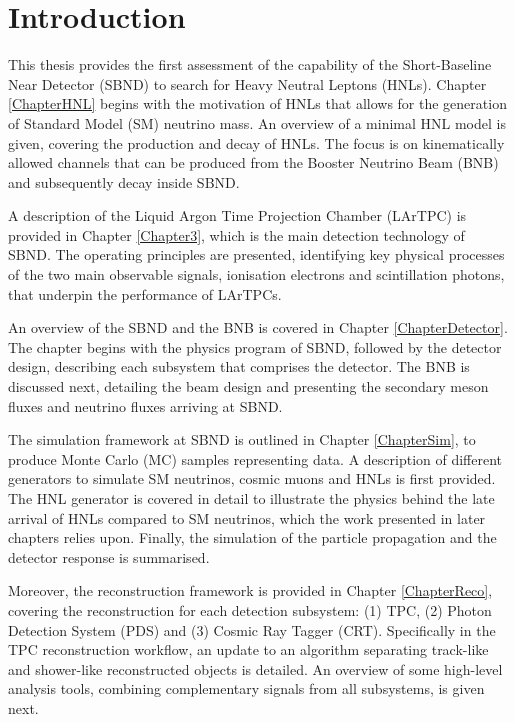 
\chapter{Introduction}  %

This thesis provides the first assessment of the capability of the Short-Baseline Near Detector (SBND) to search for Heavy Neutral Leptons (HNLs).
Chapter \ref{ChapterHNL} begins with the motivation of HNLs that allows for the generation of Standard Model (SM) neutrino mass.
An overview of a minimal HNL model is given, covering the production and decay of HNLs.
The focus is on kinematically allowed channels that can be produced from the Booster Neutrino Beam (BNB) and subsequently decay inside SBND.

A description of the Liquid Argon Time Projection Chamber (LArTPC) is provided in Chapter \ref{Chapter3}, which is the main detection technology of SBND.
The operating principles are presented, identifying key physical processes of the two main observable signals, ionisation electrons and scintillation photons, that underpin the performance of LArTPCs.

An overview of the SBND and the BNB is covered in Chapter \ref{ChapterDetector}.
The chapter begins with the physics program of SBND, followed by the detector design, describing each subsystem that comprises the detector.
The BNB is discussed next, detailing the beam design and presenting the secondary meson fluxes and neutrino fluxes arriving at SBND.

The simulation framework at SBND is outlined in Chapter \ref{ChapterSim}, to produce Monte Carlo (MC) samples representing data.
A description of different generators to simulate SM neutrinos, cosmic muons and HNLs is first provided.
The HNL generator is covered in detail to illustrate the physics behind the late arrival of HNLs compared to SM neutrinos, which the work presented in later chapters relies upon.  
Finally, the simulation of the particle propagation and the detector response is summarised.

Moreover, the reconstruction framework is provided in Chapter \ref{ChapterReco}, covering the reconstruction for each detection subsystem: (1) TPC, (2) Photon Detection System (PDS) and (3) Cosmic Ray Tagger (CRT).
Specifically in the TPC reconstruction workflow, an update to an algorithm separating track-like and shower-like reconstructed objects is detailed.
An overview of some high-level analysis tools, combining complementary signals from all subsystems, is given next. 
                                                                                                                       
